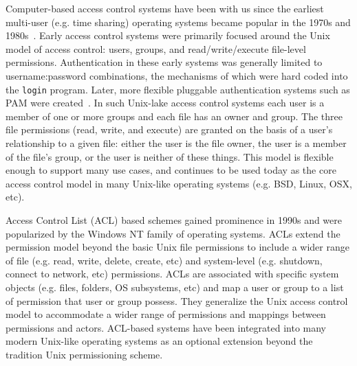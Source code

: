 Computer-based access control systems have been with us since the
earliest multi-user (e.g. time sharing) operating systems became
popular in the 1970s and 1980s~\cite{saltzer1974}. Early access
control systems were primarily focused around the Unix model of access
control: users, groups, and read/write/execute file-level
permissions. Authentication in these early systems was generally
limited to username:password combinations, the mechanisms of which
were hard coded into the \texttt{login} program. Later, more flexible
pluggable authentication systems such as PAM were
created~\cite{samar1996, linux-pam, openpam}. In such Unix-lake access
control systems each user is a member of one or more groups and each
file has an owner and group. The three file permissions (read, write,
and execute) are granted on the basis of a user's relationship to a
given file: either the user is the file owner, the user is a member of
the file's group, or the user is neither of these things. This model
is flexible enough to support many use cases, and continues to be used
today as the core access control model in many Unix-like operating
systems (e.g. BSD, Linux, OSX, etc).

Access Control List (ACL) based schemes gained prominence in 1990s and
were popularized by the Windows NT family of operating systems. ACLs
extend the permission model beyond the basic Unix file permissions to
include a wider range of file (e.g. read, write, delete, create, etc)
and system-level (e.g. shutdown, connect to network, etc)
permissions. ACLs are associated with specific system objects
(e.g. files, folders, OS subsystems, etc) and map a user or group to a
list of permission that user or group possess. They generalize the
Unix access control model to accommodate a wider range of permissions
and mappings between permissions and actors. ACL-based systems have
been integrated into many modern Unix-like operating systems as an
optional extension beyond the tradition Unix permissioning scheme.

